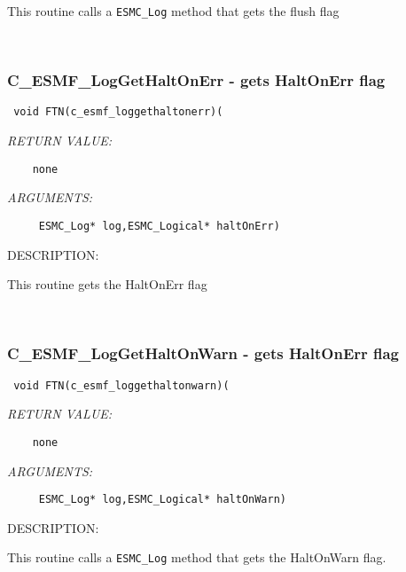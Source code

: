    This routine calls a {\tt ESMC\_Log} method that gets the flush flag
   
 
\mbox{}\hrulefill\ 
 
\subsubsection [C\_ESMF\_LogGetHaltOnErr] {C\_ESMF\_LogGetHaltOnErr - gets HaltOnErr flag }


  
\begin{verbatim} void FTN(c_esmf_loggethaltonerr)(\end{verbatim}{\em RETURN VALUE:}
\begin{verbatim}    none\end{verbatim}{\em ARGUMENTS:}
\begin{verbatim}     ESMC_Log* log,ESMC_Logical* haltOnErr)\end{verbatim}
{\sf DESCRIPTION:\\ }


   This routine gets the HaltOnErr flag
   
 
\mbox{}\hrulefill\ 
 
\subsubsection [C\_ESMF\_LogGetHaltOnWarn] {C\_ESMF\_LogGetHaltOnWarn - gets HaltOnErr flag}


  
\begin{verbatim} void FTN(c_esmf_loggethaltonwarn)(\end{verbatim}{\em RETURN VALUE:}
\begin{verbatim}    none\end{verbatim}{\em ARGUMENTS:}
\begin{verbatim}     ESMC_Log* log,ESMC_Logical* haltOnWarn)\end{verbatim}
{\sf DESCRIPTION:\\ }


    This routine calls a {\tt ESMC\_Log} method that gets the HaltOnWarn flag.
  
